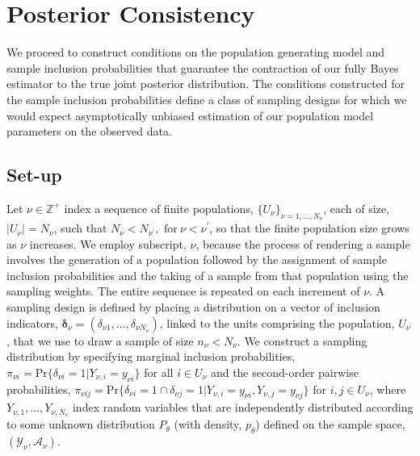\documentclass[]{imsart}
\begin{document}
\section{Posterior Consistency}\label{theory}
We proceed to construct conditions on the population generating model and sample inclusion probabilities that guarantee the contraction of our fully Bayes estimator to the true joint posterior distribution.  The conditions constructed for the sample inclusion probabilities define a class of sampling designs for which we would expect asymptotically unbiased estimation of our population model parameters on the observed data.
\subsection{Set-up}
Let $\nu \in \mathbb{Z}^{+}$ index a sequence of finite populations, $\{U_{\nu}\}_{\nu=1,\ldots,N_{\nu}}$, each of size, $\vert U_{\nu} \vert = N_{\nu}$, such that $N_{\nu} < N_{\nu^{'}},\text{ for}~\nu < \nu^{'}$, so that the finite population size grows as $\nu$ increases.  We employ subscript, $\nu$, because the process of rendering a sample involves the generation of a population followed by the assignment of sample inclusion probabilities and the taking of a sample from that population using the sampling weights.  The entire sequence is repeated on each increment of $\nu$. A sampling design is defined by placing a distribution on a vector of inclusion indicators, $\bm{\delta}_{\nu} = \left(\delta_{\nu 1},\ldots,\delta_{\nu N_{\nu}}\right)$, linked to the units comprising the population, $U_{\nu}$, that we use to draw a sample of size $n_{\nu} < N_{\nu}$.  We construct a sampling distribution by specifying marginal inclusion probabilities, $\pi_{\nu i} = \mbox{Pr}\{\delta_{\nu i} = 1\vert Y_{\nu,i} = y_{\nu i}\}$ for all $i \in U_{\nu}$ and the second-order pairwise probabilities, $\pi_{\nu ij} = \mbox{Pr}\{\delta_{\nu i} = 1 \cap \delta_{\nu j} = 1\vert Y_{\nu,i} = y_{\nu i}, Y_{\nu,j} = y_{\nu j}\}$ for $i,j \in U_{\nu}$, where $Y_{\nu,1},\ldots, Y_{\nu,N_{\nu}}$ index random variables that are independently distributed according to some unknown distribution $P_{\theta}$ (with density, $p_{\theta}$) defined on the sample space, $\left(\mathcal{Y}_{\nu},\mathcal{A}_{\nu}\right)$.
\end{document}

